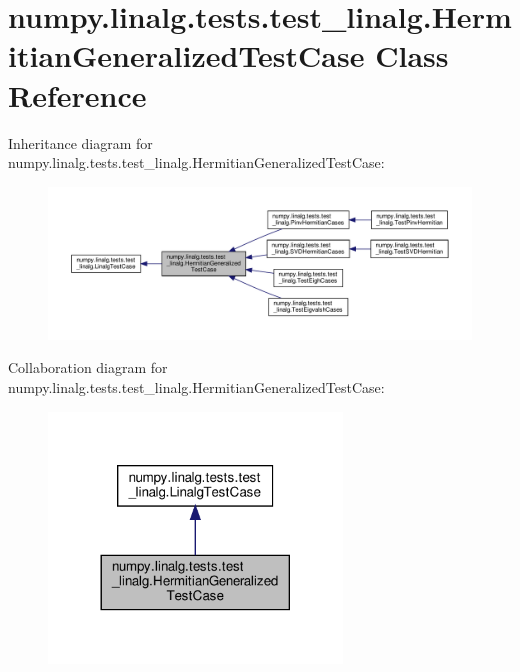 \hypertarget{classnumpy_1_1linalg_1_1tests_1_1test__linalg_1_1HermitianGeneralizedTestCase}{}\section{numpy.\+linalg.\+tests.\+test\+\_\+linalg.\+Hermitian\+Generalized\+Test\+Case Class Reference}
\label{classnumpy_1_1linalg_1_1tests_1_1test__linalg_1_1HermitianGeneralizedTestCase}


Inheritance diagram for numpy.\+linalg.\+tests.\+test\+\_\+linalg.\+Hermitian\+Generalized\+Test\+Case\+:
\nopagebreak
\begin{figure}[H]
\begin{center}
\leavevmode
\includegraphics[width=350pt]{classnumpy_1_1linalg_1_1tests_1_1test__linalg_1_1HermitianGeneralizedTestCase__inherit__graph}
\end{center}
\end{figure}


Collaboration diagram for numpy.\+linalg.\+tests.\+test\+\_\+linalg.\+Hermitian\+Generalized\+Test\+Case\+:
\nopagebreak
\begin{figure}[H]
\begin{center}
\leavevmode
\includegraphics[width=221pt]{classnumpy_1_1linalg_1_1tests_1_1test__linalg_1_1HermitianGeneralizedTestCase__coll__graph}
\end{center}
\end{figure}

